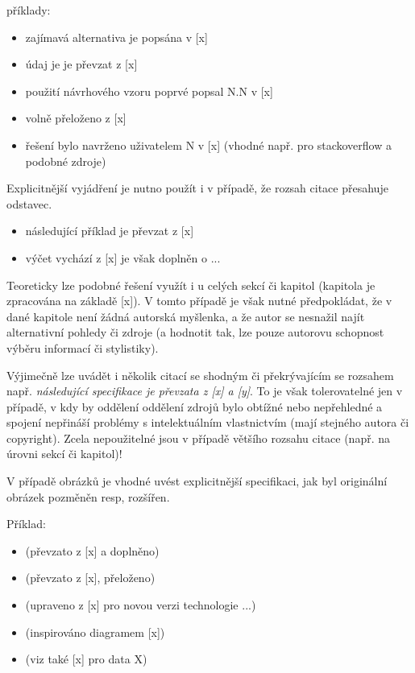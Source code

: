 \documentclass[male,czech,api_bc]{kitheses}
\begin{document}
příklady:

\begin{itemize}
\item zajímavá alternativa je popsána v [x]
\item údaj je je převzat z [x]
\item použití návrhového vzoru poprvé popsal N.N v [x]
\item volně přeloženo z [x]
\item řešení bylo navrženo uživatelem N v [x] (vhodné např. pro stackoverflow a podobné zdroje)
\end{itemize}

Explicitnější vyjádření je nutno použít i v případě, že rozsah citace přesahuje odstavec.

\begin{itemize}
\item následující příklad je převzat z [x]
\item výčet vychází z [x] je však doplněn o ...
\end{itemize}

Teoreticky lze podobné řešení využít i u celých sekcí či kapitol (kapitola je zpracována na základě [x]). V tomto případě je však nutné předpokládat, že v dané kapitole není žádná autorská myšlenka, a že autor se nesnažil najít alternativní pohledy či zdroje (a hodnotit tak, lze pouze autorovu schopnost výběru informací či stylistiky).

Výjimečně lze uvádět i několik citací se shodným či překrývajícím se rozsahem např. \textit{následující specifikace je převzata z [x] a [y]}. To je však tolerovatelné jen v případě, v kdy by oddělení oddělení zdrojů bylo obtížné nebo nepřehledné a spojení nepřináší problémy s intelektuálním vlastnictvím (mají stejného autora či copyright). Zcela nepoužitelné jsou v případě většího rozsahu citace (např. na úrovni sekcí či kapitol)!


V případě obrázků je vhodné uvést explicitnější specifikaci, jak byl originální obrázek pozměněn resp, rozšířen.

Příklad:

\begin{itemize}
\item (převzato z [x] a doplněno)
\item (převzato z [x], přeloženo)
\item (upraveno z [x] pro novou verzi technologie ...)
\item (inspirováno diagramem [x])
\item (viz také [x] pro data X)
\end{itemize}
\end{document}
